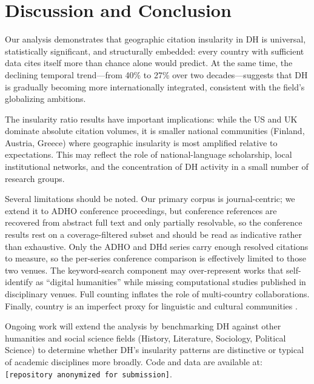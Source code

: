 \documentclass[twoside]{article}
\begin{document}
\section{Discussion and Conclusion}

Our analysis demonstrates that geographic citation insularity in DH is universal, statistically significant, and structurally embedded: every country with sufficient data cites itself more than chance alone would predict. At the same time, the declining temporal trend---from 40\% to 27\% over two decades---suggests that DH is gradually becoming more internationally integrated, consistent with the field's globalizing ambitions.

The insularity ratio results have important implications: while the US and UK dominate absolute citation volumes, it is smaller national communities (Finland, Austria, Greece) where geographic insularity is most amplified relative to expectations. This may reflect the role of national-language scholarship, local institutional networks, and the concentration of DH activity in a small number of research groups.

Several limitations should be noted. Our primary corpus is journal-centric; we extend it to ADHO conference proceedings, but conference references are recovered from abstract full text and only partially resolvable, so the conference results rest on a coverage-filtered subset and should be read as indicative rather than exhaustive. Only the ADHO and DHd series carry enough resolved citations to measure, so the per-series conference comparison is effectively limited to those two venues. The keyword-search component may over-represent works that self-identify as ``digital humanities'' while missing computational studies published in disciplinary venues. Full counting inflates the role of multi-country collaborations. Finally, country is an imperfect proxy for linguistic and cultural communities \parencite{nyhan2014,tang2017}.

Ongoing work will extend the analysis by benchmarking DH against other humanities and social science fields (History, Literature, Sociology, Political Science) to determine whether DH's insularity patterns are distinctive or typical of academic disciplines more broadly. Code and data are available at: \texttt{[repository anonymized for submission]}.


\printbibliography
\end{document}
